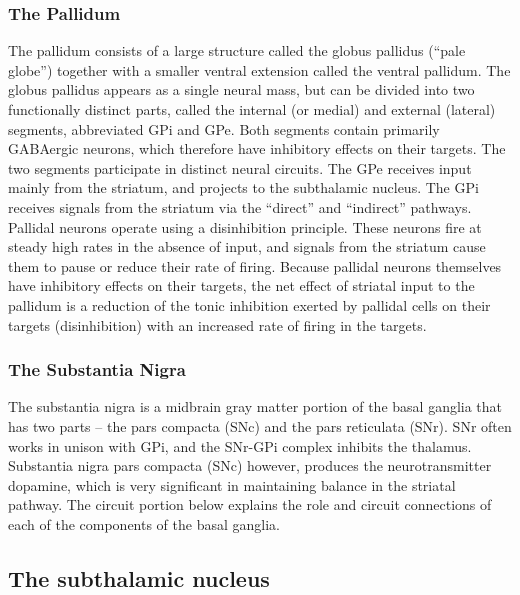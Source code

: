 \hypertarget{the-pallidum}{%
\subsubsection{The Pallidum}\label{the-pallidum}}

The pallidum consists of a large structure called the globus pallidus (``pale globe'') together with a smaller ventral extension called the ventral pallidum. The globus pallidus appears as a single neural mass, but can be divided into two functionally distinct parts, called the internal (or medial) and external (lateral) segments, abbreviated GPi and GPe. Both segments contain primarily GABAergic neurons, which therefore have inhibitory effects on their targets. The two segments participate in distinct neural circuits. The GPe receives input mainly from the striatum, and projects to the subthalamic nucleus. The GPi receives signals from the striatum via the ``direct'' and ``indirect'' pathways. Pallidal neurons operate using a disinhibition principle. These neurons fire at steady high rates in the absence of input, and signals from the striatum cause them to pause or reduce their rate of firing. Because pallidal neurons themselves have inhibitory effects on their targets, the net effect of striatal input to the pallidum is a reduction of the tonic inhibition exerted by pallidal cells on their targets (disinhibition) with an increased rate of firing in the targets.

\hypertarget{the-substantia-nigra}{%
\subsubsection{The Substantia Nigra}\label{the-substantia-nigra}}

The substantia nigra is a midbrain gray matter portion of the basal ganglia that has two parts -- the pars compacta (SNc) and the pars reticulata (SNr). SNr often works in unison with GPi, and the SNr-GPi complex inhibits the thalamus. Substantia nigra pars compacta (SNc) however, produces the neurotransmitter dopamine, which is very significant in maintaining balance in the striatal pathway. The circuit portion below explains the role and circuit connections of each of the components of the basal ganglia.

\hypertarget{the-subthalamic-nucleus}{%
\subsection{The subthalamic nucleus}\label{the-subthalamic-nucleus}}

